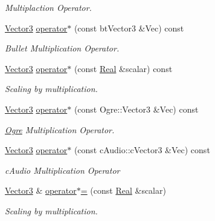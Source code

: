 \begin{DoxyCompactItemize}
\begin{DoxyCompactList}\small\item\em Multiplaction Operator. \item\end{DoxyCompactList}\item 
\hyperlink{classMezzanine_1_1Vector3}{Vector3} \hyperlink{classMezzanine_1_1Vector3_ad7edefd69b1197070e01db7e6e744af6}{operator$\ast$} (const btVector3 \&Vec) const 
\begin{DoxyCompactList}\small\item\em Bullet Multiplication Operator. \item\end{DoxyCompactList}\item 
\hyperlink{classMezzanine_1_1Vector3}{Vector3} \hyperlink{classMezzanine_1_1Vector3_ad72a28353c1aa60815050f803bc61ae0}{operator$\ast$} (const \hyperlink{namespaceMezzanine_a726731b1a7df72bf3583e4a97282c6f6}{Real} \&scalar) const 
\begin{DoxyCompactList}\small\item\em Scaling by multiplication. \item\end{DoxyCompactList}\item 
\hyperlink{classMezzanine_1_1Vector3}{Vector3} \hyperlink{classMezzanine_1_1Vector3_ae6ab1b08614f2105a61584999c3f2339}{operator$\ast$} (const Ogre::Vector3 \&Vec) const 
\begin{DoxyCompactList}\small\item\em \hyperlink{namespaceOgre}{Ogre} Multiplication Operator. \item\end{DoxyCompactList}\item 
\hyperlink{classMezzanine_1_1Vector3}{Vector3} \hyperlink{classMezzanine_1_1Vector3_ad9291ea4ef98128c77a2acdb98eade87}{operator$\ast$} (const cAudio::cVector3 \&Vec) const 
\begin{DoxyCompactList}\small\item\em cAudio Multiplication Operator \item\end{DoxyCompactList}\item 
\hyperlink{classMezzanine_1_1Vector3}{Vector3} \& \hyperlink{classMezzanine_1_1Vector3_a5e99a6ae8870ca12aa7e6e58bffef0c5}{operator$\ast$=} (const \hyperlink{namespaceMezzanine_a726731b1a7df72bf3583e4a97282c6f6}{Real} \&scalar)
\begin{DoxyCompactList}\small\item\em Scaling by multiplication. \item\end{DoxyCompactList}\item 

\end{DoxyCompactItemize}
